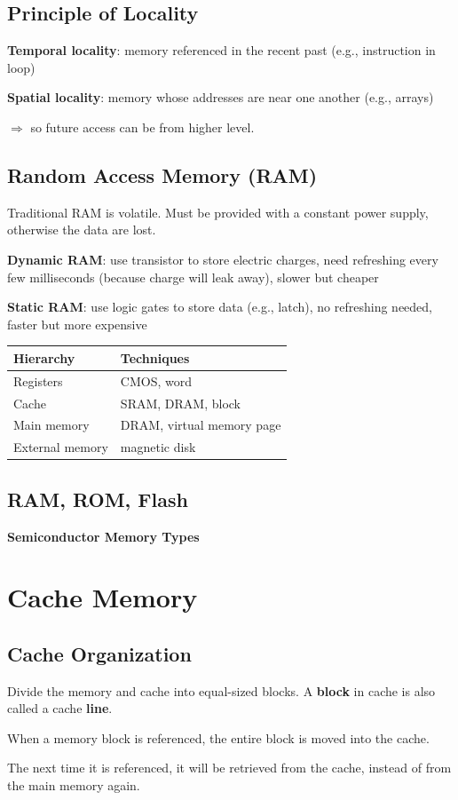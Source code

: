 \documentclass[11pt,a4paper]{article}
\begin{document}
\subsection{Principle of Locality}
\quad \textbf{Temporal locality}: memory referenced in the recent past (e.g., instruction in loop) \par

\quad \textbf{Spatial locality}: memory whose addresses are near one another (e.g., arrays) \par
$\Rightarrow$ so future access can be from higher level.

\subsection{Random Access Memory (RAM)}
Traditional RAM is volatile. Must be provided with a constant power supply, otherwise the data are lost. \par
\quad \textbf{Dynamic RAM}: use transistor to store electric charges, need refreshing every few milliseconds (because charge will leak away), slower but cheaper \par
\quad \textbf{Static RAM}: use logic gates to store data (e.g., latch), no refreshing needed, faster but more expensive 

\begin{table}[htbp]
\centering
\begin{tabular}{|l|l|}
\hline
\textbf{Hierarchy} & \textbf{Techniques} \\ \hline
Registers & CMOS, word \\ \hline
Cache & SRAM, DRAM, block \\ \hline
Main memory & DRAM, virtual memory page \\ \hline
External memory & magnetic disk \\ \hline
\end{tabular}
\end{table}

\subsection{RAM, ROM, Flash}
\textbf{Semiconductor Memory Types}

\section{Cache Memory}
\subsection{Cache Organization}
Divide the memory and cache into equal-sized blocks. A \textbf{block} in cache is also called a cache \textbf{line}. \par
When a memory block is referenced, the entire block is moved into the cache. \par
The next time it is referenced, it will be retrieved from the cache, instead of from the main memory again. 
\end{document}
